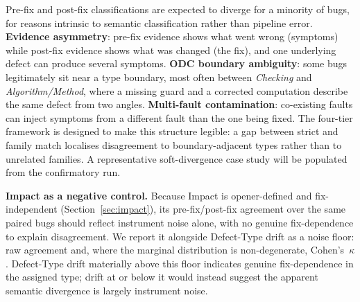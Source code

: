 Pre-fix and post-fix classifications are expected to diverge for a minority of
bugs, for reasons intrinsic to semantic classification rather than pipeline
error. \textbf{Evidence asymmetry}: pre-fix evidence shows what went wrong
(symptoms) while post-fix evidence shows what was changed (the fix), and one
underlying defect can produce several symptoms. \textbf{ODC boundary ambiguity}: some bugs
legitimately sit near a type boundary, most often between \textit{Checking}
and \textit{Algorithm/Method}, where a missing guard and a corrected computation
describe the same defect from two angles. \textbf{Multi-fault contamination}:
co-existing faults \citep{callaghan2024mf} can inject symptoms from a different
fault than the one being fixed. The four-tier framework is designed to make this
structure legible: a gap between strict and family match localises disagreement
to boundary-adjacent types rather than to unrelated families. A representative
soft-divergence case study will be populated from the confirmatory run.

\textbf{Impact as a negative control.} Because Impact is opener-defined and
fix-independent (Section~\ref{sec:impact}), its pre-fix/post-fix agreement over
the same paired bugs should reflect instrument noise alone, with no genuine
fix-dependence to explain disagreement. We report it alongside Defect-Type
drift as a noise floor: raw agreement \TBD{} and, where the marginal
distribution is non-degenerate, Cohen's~$\kappa$ \TBD{}. Defect-Type drift
materially above this floor indicates genuine fix-dependence in the assigned
type; drift at or below it would instead suggest the apparent semantic
divergence is largely instrument noise.

